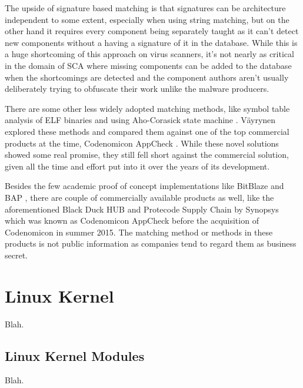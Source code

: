 The upside of signature based matching is that signatures can be architecture independent to some
extent, especially when using string matching, but on the other hand it requires every component
being separately taught as it can't detect new components without a having a signature of it in the
database. While this is a huge shortcoming of this approach on virus scanners, it's not nearly as
critical in the domain of SCA where missing components can be added to the database when the
shortcomings are detected and the component authors aren't usually deliberately trying to obfuscate
their work unlike the malware producers.

There are some other less widely adopted matching methods, like symbol table analysis of ELF
binaries and using Aho-Corasick state machine \cite{aho1975efficient}. Väyrynen explored these
methods and compared them against one of the top commercial products at the time, Codenomicon
AppCheck \cite{vayrynen2014finding}. While these novel solutions showed some real promise, they
still fell short against the commercial solution, given all the time and effort put into it over
the years of its development.

Besides the few academic proof of concept implementations like BitBlaze \cite{song2008bitblaze} and
BAP \cite{brumley2011bap}, there are couple of commercially available products as well, like the
aforementioned Black Duck HUB \cite{blackduckhub} and Protecode Supply Chain by Synopsys
\cite{synopsysprotecodesc} which was known as Codenomicon AppCheck before the acquisition of
Codenomicon in summer 2015. The matching method or methods in these products is not public
information as companies tend to regard them as business secret.

\section{Linux Kernel}

Blah.

\subsection{Linux Kernel Modules}

Blah.
